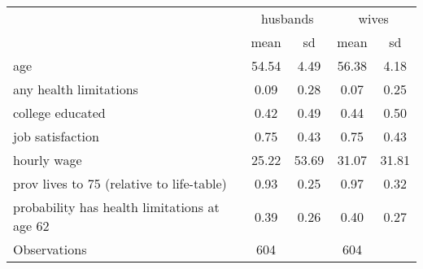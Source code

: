 {
\def\sym#1{\ifmmode^{#1}\else\(^{#1}\)\fi}
\begin{tabular}{l*{2}{cc}}
\hline\hline
                    &\multicolumn{2}{c}{husbands}&\multicolumn{2}{c}{wives}\\
                    &        mean&          sd&        mean&          sd\\
\hline
age                 &       54.54&        4.49&       56.38&        4.18\\
any health limitations&        0.09&        0.28&        0.07&        0.25\\
college educated    &        0.42&        0.49&        0.44&        0.50\\
job satisfaction    &        0.75&        0.43&        0.75&        0.43\\
hourly wage         &       25.22&       53.69&       31.07&       31.81\\
prov lives to 75 (relative to life-table)&        0.93&        0.25&        0.97&        0.32\\
probability has health limitations at age 62&        0.39&        0.26&        0.40&        0.27\\
\hline
Observations        &         604&            &         604&            \\
\hline\hline
\end{tabular}
}
